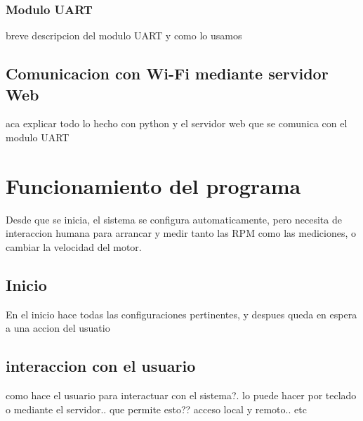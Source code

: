 \documentclass[a4paper]{article}
\begin{document}

\subsubsection{Modulo UART} %
\label{ssub:modulo_uart}

breve descripcion del modulo UART y como lo usamos



\subsection{Comunicacion con Wi-Fi mediante servidor Web} %
\label{sub:comunicacion_con_wi_fi_mediante_servidor_web}

aca explicar todo lo hecho con python y el servidor web que se comunica con el modulo UART


\section{Funcionamiento del programa} %
\label{sec:funcionamiento_del_programa}

Desde que se inicia, el sistema se configura automaticamente, pero necesita de interaccion humana para arrancar y medir tanto las RPM como las mediciones, o cambiar la velocidad del motor.

\subsection{Inicio} %
\label{sub:inicio}

En el inicio hace todas las configuraciones pertinentes, y despues queda en espera a una accion del usuatio


\subsection{interaccion con el usuario} %
\label{sub:interaccion_con_el_usuario}

como hace el usuario para interactuar con el sistema?. lo puede hacer por teclado o mediante el servidor.. que permite esto?? acceso local y remoto.. etc
\end{document}
